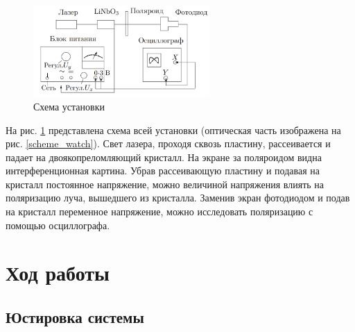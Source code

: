 \documentclass[a4paper, 12pt]{article}
\begin{document}
\clearpage
\begin{figure}[h!]
\begin{center}
\includegraphics[width = 0.6\textwidth]{2.png}
\end{center}
\caption{Схема установки}
\label{scheme}
\end{figure}
На рис. \ref{scheme} представлена схема всей установки (оптическая часть изображена на рис. \ref{scheme_watch}). Свет лазера, проходя сквозь пластину, рассеивается и падает на двоякопреломляющий кристалл. На экране за поляроидом видна интерференционная картина. Убрав рассеивающую пластину и подавая на кристалл постоянное напряжение, можно величиной напряжения влиять на поляризацию луча, вышедшего из кристалла. Заменив экран фотодиодом и подав на кристалл переменное напряжение, можно исследовать поляризацию с помощью осциллографа.

\newpage

\section{Ход работы}
\subsection{Юстировка системы}
\end{document}
